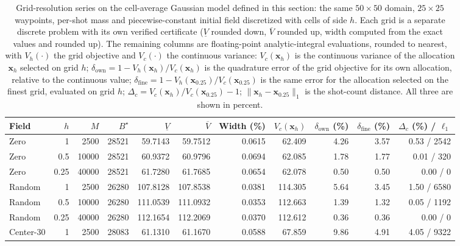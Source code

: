 \begin{table}[!tbp]\centering\footnotesize\setlength{\tabcolsep}{3pt}
\caption{Grid-resolution series on the cell-average Gaussian model defined in this section:
the same $50\times50$ domain, $25\times25$ waypoints, per-shot mass and piecewise-constant initial
field discretized with cells of side $h$. Each grid is a separate discrete problem with its own verified
certificate ($\underline V$ rounded down, $\overline V$ rounded up, width computed from the exact values and
rounded up). The remaining columns are floating-point analytic-integral evaluations, rounded to nearest,
with $V_h(\cdot)$ the grid objective and $V_c(\cdot)$ the continuous variance: $V_c(\mathbf{x}_h)$ is
the continuous variance of the allocation $\mathbf{x}_h$ selected on grid $h$;
$\delta_{\mathrm{own}}=1-V_h(\mathbf{x}_h)/V_c(\mathbf{x}_h)$ is the quadrature error of the grid
objective for its own allocation, relative to the continuous value;
$\delta_{\mathrm{fine}}=1-V_h(\mathbf{x}_{0.25})/V_c(\mathbf{x}_{0.25})$ is the same error for the
allocation selected on the finest grid, evaluated on grid $h$; $\Delta_c=V_c(\mathbf{x}_h)/V_c(\mathbf{x}_{0.25})-1$;
$\|\mathbf{x}_h-\mathbf{x}_{0.25}\|_1$ is the shot-count distance. All three are shown in percent.}
\label{tab:mesh-series-si}
\begin{tabular}{lrrrrrrrrrr}
\toprule
Field & $h$ & $M$ & $B^\star$ & $\underline V$ & $\overline V$ & Width (\%) & $V_c(\mathbf{x}_h)$ & $\delta_{\mathrm{own}}$ (\%) & $\delta_{\mathrm{fine}}$ (\%) & $\Delta_c$ (\%) / $\ell_1$\\
\midrule
Zero & 1 & 2500 & 28521 & 59.7143 & 59.7512 & 0.0615 & 62.409 & 4.26 & 3.57 & 0.53 / 2542\\
Zero & 0.5 & 10000 & 28521 & 60.9372 & 60.9796 & 0.0694 & 62.085 & 1.78 & 1.77 & 0.01 / 320\\
Zero & 0.25 & 40000 & 28521 & 61.7280 & 61.7685 & 0.0654 & 62.078 & 0.50 & 0.50 & 0.00 / 0\\
\addlinespace[2pt]
Random & 1 & 2500 & 26280 & 107.8128 & 107.8538 & 0.0381 & 114.305 & 5.64 & 3.45 & 1.50 / 6580\\
Random & 0.5 & 10000 & 26280 & 111.0539 & 111.0932 & 0.0353 & 112.663 & 1.39 & 1.32 & 0.05 / 1192\\
Random & 0.25 & 40000 & 26280 & 112.1654 & 112.2069 & 0.0370 & 112.612 & 0.36 & 0.36 & 0.00 / 0\\
\addlinespace[2pt]
Center-30 & 1 & 2500 & 28083 & 61.1310 & 61.1670 & 0.0588 & 67.859 & 9.86 & 4.91 & 4.05 / 9322\\

\end{tabular}
\end{table}
